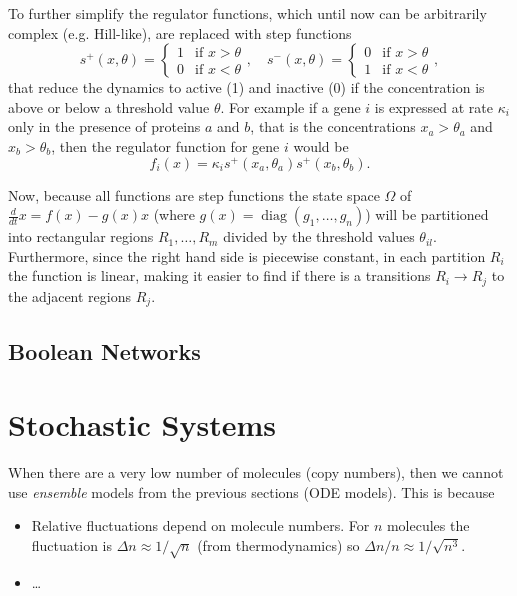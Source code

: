 \documentclass[a4paper]{article}
\theoremstyle{plain}
\theoremstyle{definition}
\theoremstyle{remark}
\begin{document}
To further simplify the regulator functions, which until now can be
arbitrarily complex (e.g. Hill-like), are replaced with step functions
\[
  s^+ (x, \theta) = \begin{cases}
    1 & \text{if } x > \theta \\
    0 & \text{if } x < \theta
  \end{cases},
  \quad
  s^- (x, \theta) = \begin{cases}
    0 & \text{if } x > \theta \\
    1 & \text{if } x < \theta
  \end{cases},
\]
that reduce the dynamics to active (1) and inactive (0) if the concentration
is above or below a threshold value $\theta$. For example if a gene $i$ is
expressed at rate $\kappa_i$ only in the presence of proteins $a$ and $b$,
that is the concentrations $x_a > \theta_a$ and $x_b > \theta_b$, then the
regulator function for gene $i$ would be
\[
  f_i(x) = \kappa_{i} s^+(x_a, \theta_a) s^+(x_b, \theta_b).
\]

Now, because all functions are step functions the state space $\Omega$ of
$\frac{d}{dt} x = f(x) - g(x) x$ (where $g(x) = \operatorname{diag}(g_1,
\ldots, g_n)$) will be partitioned into rectangular regions $R_1, \ldots, R_m$
divided by the threshold values $\theta_{il}$. Furthermore, since the right
hand side is piecewise constant, in each partition $R_i$ the function is
linear, making it easier to find if there is a transitions $R_i \to R_j$ to
the adjacent regions $R_j$.

\subsection{Boolean Networks}


\section{Stochastic Systems}

When there are a very low number of molecules (copy numbers), then we cannot
use \emph{ensemble} models from the previous sections (ODE models). This is
because
\begin{itemize}
  \item Relative fluctuations depend on molecule numbers. For $n$ molecules
    the fluctuation is $\Delta n \approx 1 / \sqrt{n}$ (from thermodynamics)
    so $\Delta n / n \approx 1 / \sqrt{n^3}$.
  \item \ldots
\end{itemize}
\end{document}

